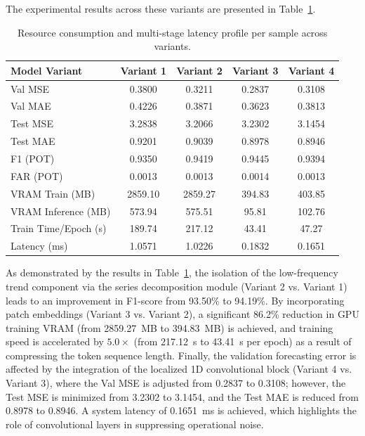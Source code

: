 \documentclass[cmes,article,submit,moreauthors,pdftex]{Definitions/tsp}
\begin{document}
The experimental results across these variants are presented in Table~\ref{tabref:table-5}.

\begin{table}[htbp] 
\tablesize{\footnotesize}
\caption{Resource consumption and multi-stage latency profile per sample across variants.}
\label{tabref:table-5}
\begin{tabularx}{\textwidth}{>{\raggedright\arraybackslash}X c c c c}
\toprule
\textbf{Model Variant} & \textbf{Variant 1} & \textbf{Variant 2} & \textbf{Variant 3} & \textbf{Variant 4} \\
\midrule
Val MSE & 0.3800 & 0.3211 & 0.2837 & 0.3108 \\
Val MAE & 0.4226 & 0.3871 & 0.3623 & 0.3813 \\
Test MSE & 3.2838 & 3.2066 & 3.2302 & 3.1454 \\
Test MAE & 0.9201 & 0.9039 & 0.8978 & 0.8946 \\
\midrule
F1 (POT) & 0.9350 & 0.9419 & 0.9445 & 0.9394 \\
FAR (POT) & 0.0013 & 0.0013 & 0.0014 & 0.0013 \\
\midrule
VRAM Train (MB) & 2859.10 & 2859.27 & 394.83 & 403.85 \\
VRAM Inference (MB) & 573.94 & 575.51 & 95.81 & 102.76 \\
Train Time/Epoch (s) & 189.74 & 217.12 & 43.41 & 47.27 \\
Latency (ms) & 1.0571 & 1.0226 & 0.1832 & 0.1651 \\
\bottomrule
\end{tabularx}
\end{table}

As demonstrated by the results in Table~\ref{tabref:table-5}, the isolation of the low-frequency trend component via the series decomposition module (Variant 2 vs. Variant 1) leads to an improvement in F1-score from 93.50\% to 94.19\%. By incorporating patch embeddings (Variant 3 vs. Variant 2), a significant 86.2\% reduction in GPU training VRAM (from 2859.27~MB to 394.83~MB) is achieved, and training speed is accelerated by $5.0\times$ (from 217.12~s to 43.41~s per epoch) as a result of compressing the token sequence length. Finally, the validation forecasting error is affected by the integration of the localized 1D convolutional block (Variant 4 vs. Variant 3), where the Val MSE is adjusted from 0.2837 to 0.3108; however, the Test MSE is minimized from 3.2302 to 3.1454, and the Test MAE is reduced from 0.8978 to 0.8946. A system latency of 0.1651~ms is achieved, which highlights the role of convolutional layers in suppressing operational noise.
\end{document}

